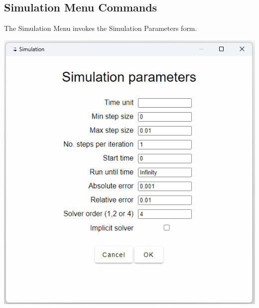 \subsection{Simulation Menu Commands}

\label{RungeKutta}

The Simulation Menu invokes the Simulation Parameters form.

\noindent\includegraphics[width=\textwidth]{images/SimulationParameters}

